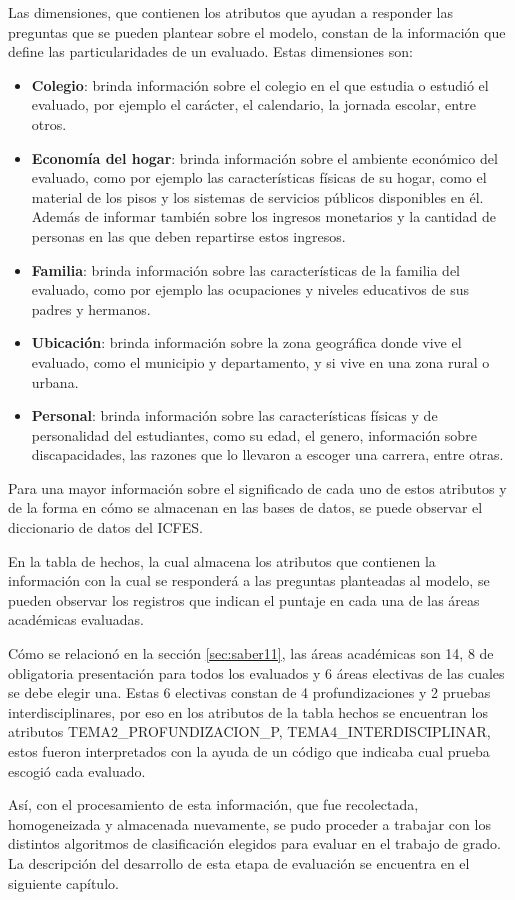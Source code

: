 Las dimensiones, que contienen los atributos que ayudan a responder las preguntas que se pueden plantear sobre el modelo, constan de la información que define las particularidades de un evaluado. Estas dimensiones son: 
\begin{itemize}
\item \textbf{Colegio}: brinda información sobre el colegio en el que estudia o estudió el evaluado, por ejemplo el carácter, el calendario, la jornada escolar, entre otros.
\item \textbf{Economía del hogar}: brinda información sobre el ambiente económico del evaluado, como por ejemplo las características físicas de su hogar, como el material de los pisos y los sistemas de servicios públicos disponibles en él. Además de informar también sobre los ingresos monetarios y la cantidad de personas en las que deben repartirse estos ingresos.
\item \textbf{Familia}: brinda información sobre las características de la familia del evaluado, como por ejemplo las ocupaciones y niveles educativos de sus padres y hermanos.
\item \textbf{Ubicación}: brinda información sobre la zona geográfica donde vive el evaluado, como el municipio y departamento, y si vive en una zona rural o urbana.
\item \textbf{Personal}: brinda información sobre las características físicas y de personalidad del estudiantes, como su edad, el genero, información sobre discapacidades, las razones que lo llevaron a escoger una carrera, entre otras.
\end{itemize}
Para una mayor información sobre el significado de cada uno de estos atributos y de la forma en cómo se almacenan en las bases de datos, se puede observar el diccionario de datos del ICFES.

En la tabla de hechos, la cual almacena los atributos que contienen la información con la cual se responderá  a las preguntas planteadas al modelo, se pueden observar los registros que indican el puntaje en cada una de las áreas académicas evaluadas. 

Cómo se relacionó en la sección \ref{sec:saber11}, las áreas académicas son 14, 8 de obligatoria presentación para todos los evaluados y 6 áreas electivas de las cuales se debe elegir una. Estas 6 electivas constan de 4 profundizaciones y 2 pruebas interdisciplinares, por eso en los atributos de la tabla hechos se encuentran los atributos  TEMA2_PROFUNDIZACION_P, TEMA4_INTERDISCIPLINAR, estos fueron interpretados con la ayuda de un código que indicaba cual prueba escogió cada evaluado.

Así, con el procesamiento de esta información, que fue recolectada, homogeneizada y almacenada nuevamente, se pudo proceder a trabajar con los distintos algoritmos de clasificación elegidos para evaluar en el trabajo de grado. La descripción del desarrollo de esta etapa de evaluación se encuentra en el siguiente capítulo.